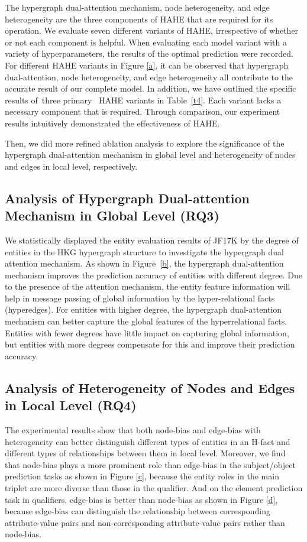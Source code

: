\documentclass[11pt]{article}
\begin{document}
The hypergraph dual-attention mechanism, node heterogeneity, and edge heterogeneity are the three components of HAHE that are required for its operation. We evaluate seven different variants of HAHE, irrespective of whether or not each component is helpful. When evaluating each model variant with a variety of hyperparameters, the results of the optimal prediction were recorded. For different HAHE variants in Figure \ref{a}, it can be observed that hypergraph dual-attention, node heterogeneity, and edge heterogeneity all contribute to the accurate result of our complete model. In addition, we have outlined the specific results of three primary  HAHE variants in Table~\ref{t4}. Each variant lacks a necessary component that is required. Through comparison, our experiment results intuitively demonstrated the effectiveness of HAHE.

Then, we did more refined ablation analysis to explore the significance of the hypergraph dual-attention mechanism in global level and heterogeneity of nodes and edges in local level, respectively.

\subsection{Analysis of Hypergraph Dual-attention Mechanism in Global Level (RQ3)}

We statistically displayed the entity evaluation results of JF17K by the degree of entities in the HKG hypergraph structure to investigate the hypergraph dual attention mechanism. As shown in Figure~\ref{b}, the hypergraph dual-attention mechanism improves the prediction accuracy of entities with different degree. Due to the presence of the attention mechanism, the entity feature information will help in message passing of global information by the hyper-relational facts (hyperedges). For entities with higher degree, the hypergraph dual-attention mechanism can better capture the global features of the hyperrelational facts. Entities with fewer degrees have little impact on capturing global information, but entities with more degrees compensate for this and improve their prediction accuracy.


\subsection{Analysis of Heterogeneity of Nodes and Edges in Local Level (RQ4)}

The experimental results show that both node-bias and edge-bias with heterogeneity can better distinguish different types of entities in an H-fact and different types of relationships between them in local level. Moreover, we find that node-bias plays a more prominent role than edge-bias in the subject/object prediction tasks as shown in Figure \ref{c}, because the entity roles in the main triplet are more diverse than those in the qualifier. And on the element prediction task in qualifiers, edge-bias is better than node-bias as shown in Figure \ref{d}, because edge-bias can distinguish the relationship between corresponding attribute-value pairs  and non-corresponding attribute-value pairs  rather than node-bias.
\end{document}
